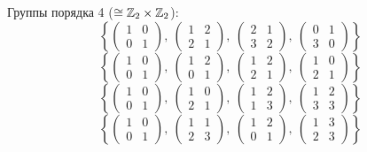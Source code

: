 \documentclass[11pt, fleqn]{article}
\begin{document}
\begin{enumerate}
      Группы порядка 4 ($\cong \mathbb{Z}_2 \times \mathbb{Z}_2$):
      \[\left\{ \begin{pmatrix}
          1 & 0\\
          0 & 1
      \end{pmatrix},\ \begin{pmatrix}
          1 & 2\\
          2 & 1
      \end{pmatrix},\ \begin{pmatrix}
          2 & 1\\
          3 & 2
      \end{pmatrix},\ \begin{pmatrix}
          0 & 1\\
          3 & 0
      \end{pmatrix}\right\}\]
      \[\left\{ \begin{pmatrix}
          1 & 0\\
          0 & 1
      \end{pmatrix},\ \begin{pmatrix}
          1 & 2\\
          0 & 1
      \end{pmatrix},\ \begin{pmatrix}
          1 & 2\\
          2 & 1
      \end{pmatrix},\ \begin{pmatrix}
          1 & 0\\
          2 & 1
      \end{pmatrix}\right\}\]
      \[\left\{ \begin{pmatrix}
          1 & 0\\
          0 & 1
      \end{pmatrix},\ \begin{pmatrix}
          1 & 0\\
          2 & 1
      \end{pmatrix},\ \begin{pmatrix}
          1 & 2\\
          1 & 3
      \end{pmatrix},\ \begin{pmatrix}
          1 & 2\\
          3 & 3
      \end{pmatrix}\right\}\]
      \[\left\{ \begin{pmatrix}
          1 & 0\\
          0 & 1
      \end{pmatrix},\ \begin{pmatrix}
          1 & 1\\
          2 & 3
      \end{pmatrix},\ \begin{pmatrix}
          1 & 2\\
          0 & 1
      \end{pmatrix},\ \begin{pmatrix}
          1 & 3\\
          2 & 3
      \end{pmatrix}\right\}\]


\end{enumerate}
\end{document}
